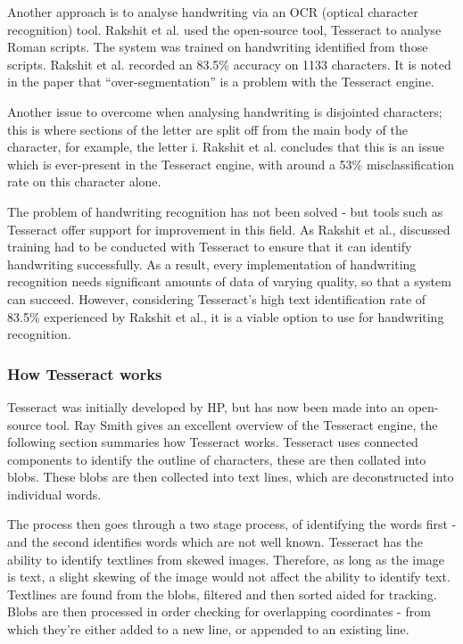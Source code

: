 Another approach is to analyse handwriting via an OCR (optical character recognition) tool. Rakshit et al. \cite{citeulike:13920972} used the open-source tool, Tesseract \cite{citeulike:14014368} to analyse Roman scripts. The system was trained on handwriting identified from those scripts. Rakshit et al. recorded an 83.5\% accuracy on 1133 characters. It is noted in the paper that ``over-segmentation'' is a problem with the Tesseract engine.

Another issue to overcome when analysing handwriting is disjointed characters; this is where sections of the letter are split off from the main body of the character, for example, the letter i. Rakshit et al. concludes that this is an issue which is ever-present in the Tesseract engine, with around a 53\% misclassification rate on this character alone.

The problem of handwriting recognition has not been solved - but tools such as Tesseract offer support for improvement in this field. As Rakshit et al., discussed training had to be conducted with Tesseract to ensure that it can identify handwriting successfully. As a result, every implementation of handwriting recognition needs significant amounts of data of varying quality, so that a system can succeed. However, considering Tesseract's high text identification rate of 83.5\% experienced by Rakshit et al., it is a viable option to use for handwriting recognition.

\subsubsection{How Tesseract works}
Tesseract was initially developed by HP, but has now been made into an open-source tool. Ray Smith gives an excellent overview of the Tesseract engine, the following section summaries how Tesseract works. Tesseract uses connected components to identify the outline of characters, these are then collated into blobs. These blobs are then collected into text lines, which are deconstructed into individual words.

The process then goes through a two stage process, of identifying the words first - and the second identifies words which are not well known. Tesseract has the ability to identify textlines from skewed images. Therefore, as long as the image is text, a slight skewing of the image would not affect the ability to identify text. Textlines are found from the blobs, filtered and then sorted aided for tracking. Blobs are then processed in order checking for overlapping coordinates - from which they're either added to a new line, or appended to an existing line.

